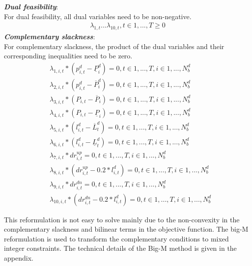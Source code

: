  \textbf{\emph{Dual feasibility}}: \\
For dual feasibility, all dual variables need to be non-negative.
\begin{align}
\lambda_{1,t} ... \lambda_{10,t} , t\in{1,...,T} \geq 0 
\end{align}
\textbf{\emph{Complementary slackness}}: \\
For complementary slackness, the product of the dual variables and their corresponding inequalities need to be zero.
\begin{align}
& \lambda_{1,i,t}*(p^d_{i,t}-\underline P^d_i) = 0, t\in{1,...,T}, i\in{1,...,N^d_b}  \\
& \lambda_{2,i,t} *(p^d_{i,t}-\overline P^d_i) = 0 , t\in{1,...,T}, i\in{1,...,N^d_b}  \\
& \lambda_{3,i,t}*(P_{i,t}-\overline P_i) = 0 , t\in{1,...,T}, i\in{1,...,N^d_b}  \\
& \lambda_{4,i,t}*(P_{i,t}-\underline P_i) = 0 , t\in{1,...,T}, i\in{1,...,N^d_b}  \\
& \lambda_{5,i,t}*(l^d_{i,t}-\overline L^d_{t}) = 0 , t\in{1,...,T} , i\in{1,...,N^d_b} \\
& \lambda_{6,i,t}*(l^d_{i,t}-\underline L^d_t) = 0 , t\in{1,...,T}, i\in{1,...,N^d_b}  \\
& \lambda_{7,i,t}*dr_{i,t}^{up} = 0 , t\in{1,...,T} , i\in{1,...,N^d_b} \\
& \lambda_{8,i,t}*(dr_{i,t}^{up}-0.2*l^d_{i,t}) = 0 , t\in{1,...,T} , i\in{1,...,N^d_b} \\
& \lambda_{9,i,t}*dr_{i,t}^{dn} = 0, t\in{1,...,T} , i\in{1,...,N^d_b}  \\
& \lambda_{10,i,t}*(dr_{i,t}^{dn}-0.2*l^d_{i,t}) = 0 , t\in{1,...,T} , i\in{1,...,N^d_b} 
\end{align}

This reformulation is not easy to solve mainly due to the non-convexity in the complementary slackness and bilinear terms in the objective function. The big-M reformulation is used to transform the complementary conditions to mixed integer constraints. The technical details of the Big-M method is given in the appendix. 

